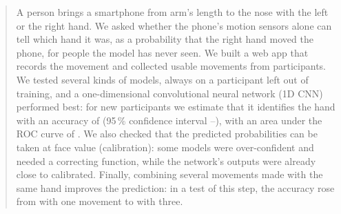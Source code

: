 \begin{abstract}
\noindent A person brings a smartphone from arm's length to the nose with the left or the right hand. We asked
whether the phone's motion sensors alone can tell which hand it was, as a probability \pright{} that the right
hand moved the phone, for people the model has never seen. We built a web app that records the movement and
collected  usable movements from  participants. We tested several
kinds of models, always on a participant left out of training, and a one-dimensional convolutional neural network
(1D CNN) performed best: for new participants we estimate that it identifies the hand with an accuracy of
 (95\,\% confidence interval --),
with an area under the ROC curve of . We also checked that the predicted probabilities can be taken at face value (calibration):
some models were over-confident and needed a correcting function, while the network's outputs were already close to
calibrated. Finally, combining several movements made with the same hand improves the prediction: in a test of this
step, the accuracy rose from  with one movement to  with three.
\end{abstract}

